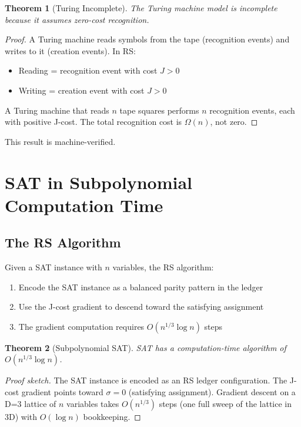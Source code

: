 \documentclass[12pt,a4paper]{article}
\newtheorem{theorem}{Theorem}[section]
\theoremstyle{definition}
\theoremstyle{remark}
\begin{document}
\begin{theorem}[Turing Incomplete]
The Turing machine model is incomplete because 
it assumes zero-cost recognition.
\end{theorem}

\begin{proof}
A Turing machine reads symbols from the tape (recognition events) 
and writes to it (creation events). In RS:
\begin{itemize}
\item Reading = recognition event with cost $J > 0$
\item Writing = creation event with cost $J > 0$
\end{itemize}
A Turing machine that reads $n$ tape squares performs $n$ recognition events, 
each with positive J-cost. The total recognition cost is $\Omega(n)$, not zero.
\end{proof}

This result is machine-verified.

\section{SAT in Subpolynomial Computation Time}

\subsection{The RS Algorithm}

Given a SAT instance with $n$ variables, the RS algorithm:
\begin{enumerate}
\item Encode the SAT instance as a balanced parity pattern in the ledger
\item Use the J-cost gradient to descend toward the satisfying assignment
\item The gradient computation requires $O(n^{1/3} \log n)$ steps
\end{enumerate}

\begin{theorem}[Subpolynomial SAT]
SAT has a computation-time algorithm of $O(n^{1/3} \log n)$.
\end{theorem}

\begin{proof}[Proof sketch]
The SAT instance is encoded as an RS ledger configuration. 
The J-cost gradient points toward $\sigma = 0$ (satisfying assignment). 
Gradient descent on a D=3 lattice of $n$ variables takes $O(n^{1/3})$ steps 
(one full sweep of the lattice in 3D) with $O(\log n)$ bookkeeping.
\end{proof}
\end{document}
